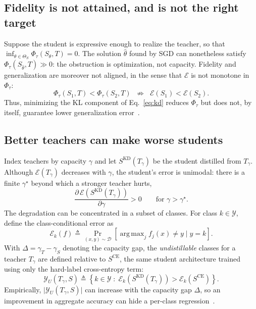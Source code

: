 \documentclass[review,number,sort&compress]{elsarticle}
\theoremstyle{definition}
\DeclareMathOperator*{\argmax}{arg\,max}
\begin{document}
\subsection{Fidelity is not attained, and is not the right target}
\label{sec:f1}

Suppose the student is expressive enough to realize the teacher, so that
$\inf_{\theta \in \Theta_S} \Phi_{\tau}(S_{\theta},T) = 0$. The solution
$\hat{\theta}$ found by SGD can nonetheless satisfy
$\Phi_{\tau}(S_{\hat{\theta}},T) \gg 0$: the obstruction is optimization, not
capacity. Fidelity and generalization are moreover not aligned, in the sense
that $\mathcal{E}$ is not monotone in $\Phi_{\tau}$:
\begin{equation}
\label{eq:decoupling}
\Phi_{\tau}(S_1, T) < \Phi_{\tau}(S_2, T)
\;\;\not\Longrightarrow\;\;
\mathcal{E}(S_1) < \mathcal{E}(S_2).
\end{equation}
Thus, minimizing the KL component of Eq.~\eqref{eq:kd} reduces
$\Phi_{\tau}$ but does not, by itself, guarantee lower generalization
error~\citep{stanton2021does}.

\subsection{Better teachers can make worse students}
\label{sec:f2}

Index teachers by capacity $\gamma$ and let $S^{\mathrm{KD}}(T_\gamma)$ be the
student distilled from $T_\gamma$. Although $\mathcal{E}(T_\gamma)$ decreases
with $\gamma$, the student's error is unimodal: there is a finite
$\gamma^\star$ beyond which a stronger teacher hurts,
\begin{equation}
\label{eq:capacity}
\frac{\partial\, \mathcal{E}\!\left(S^{\mathrm{KD}}(T_\gamma)\right)}{\partial \gamma} > 0
\qquad \text{for } \gamma > \gamma^\star .
\end{equation}
The degradation can be concentrated in a subset of classes. For class
$k\in\mathcal{Y}$, define the class-conditional error as
\begin{equation}
\label{eq:class-conditional-error}
\mathcal{E}_k(f) \triangleq
\Pr_{(x,y)\sim\mathcal{D}}\!\left[
\argmax_j f_j(x) \neq y \mid y=k
\right].
\end{equation}
With $\Delta = \gamma_T-\gamma_S$ denoting the capacity gap, the
\emph{undistillable} classes for a teacher $T_\gamma$ are defined relative to
$S^{\mathrm{CE}}$, the same student architecture trained using only the
hard-label cross-entropy term:
\begin{equation}
\label{eq:undistillable}
\mathcal{Y}_U(T_\gamma,S) \triangleq \left\{ k \in \mathcal{Y} \;:\;
\mathcal{E}_k\!\left(S^{\mathrm{KD}}(T_\gamma)\right) >
\mathcal{E}_k\!\left(S^{\mathrm{CE}}\right) \right\}.
\end{equation}
Empirically, $\lvert\mathcal{Y}_U(T_\gamma,S)\rvert$ can increase with the
capacity gap $\Delta$, so an improvement in aggregate accuracy can hide a
per-class regression~\citep{zhu2022teach}.
\end{document}
